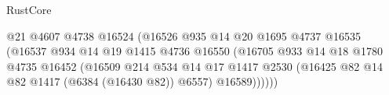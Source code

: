 \begin{lexlean}{RustCore}
\begin{coremodule}
                                                      @21
                                                      @4607
                                                      @4738
                                                      @16524
                                                      (@16526
                                                        @935
                                                        @14
                                                        @20
                                                        @1695
                                                        @4737
                                                        @16535
                                                        (@16537
                                                          @934
                                                          @14
                                                          @19
                                                          @1415
                                                          @4736
                                                          @16550
                                                          (@16705
                                                            @933
                                                            @14
                                                            @18
                                                            @1780
                                                            @4735
                                                            @16452
                                                            (@16509
                                                              @214
                                                              @534
                                                              @14
                                                              @17
                                                              @1417
                                                              @2530
                                                              (@16425
                                                                @82
                                                                @14
                                                                @82
                                                                @1417
                                                                (@6384 (@16430 @82))
                                                                @6557)
                                                              @16589))))))

\end{coremodule}
\end{lexlean}
